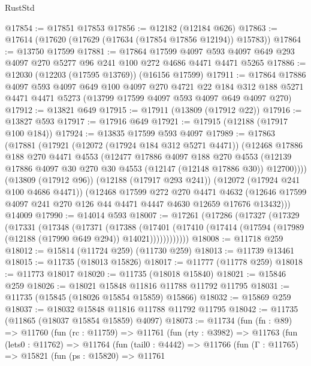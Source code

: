 \begin{lexlean}{RustStd}
\begin{coremodule}
@17854 := @17851 @17853
@17856 := @12182 (@12184 @626)
@17863 := @17614 (@17620 (@17629 (@17634 (@17854 @17856 @12194)) @15783))
@17864 := @13750 @17599
@17881 := @17864
    @17599
    @4097
    @593
    @4097
    @649
    @293
    @4097
    @270
    @5277
    @96
    @241
    @100
    @272
    @4686
    @4471
    @4471
    @5265
@17886 := @12030 (@12203 (@17595 @13769)) (@16156 @17599)
@17911 := @17864
    @17886
    @4097
    @593
    @4097
    @649
    @100
    @4097
    @270
    @4721
    @22
    @184
    @312
    @188
    @5271
    @4471
    @4471
    @5273
    (@13799 @17599 @4097 @593 @4097 @649 @4097 @270)
@17912 := @13821 @649
@17915 := @17911 (@13809 (@17912 @22))
@17916 := @13827 @593
@17917 := @17916 @649
@17921 := @17915 (@12188 (@17917 @100 @184))
@17924 := @13835 @17599 @593 @4097
@17989 := @17863
    (@17881
      (@17921
        (@12072 (@17924 @184 @312 @5271 @4471))
        (@12468
          @17886
          @188
          @270
          @4471
          @4553
          (@12477
            @17886
            @4097
            @188
            @270
            @4553
            (@12139 @17886 @4097 @30 @270 @30 @4553 (@12147 (@12148 @17886 @30)) @12700))))
      (@13809 (@17912 @96))
      (@12188 (@17917 @293 @241))
      (@12072 (@17924 @241 @100 @4686 @4471))
      (@12468
        @17599
        @272
        @270
        @4471
        @4632
        (@12646 @17599 @4097 @241 @270 @126 @44 @4471 @4447 @4630 @12659 @17676 @13432)))
    @14009
@17990 := @14014 @593
@18007 := @17261
    (@17286
      (@17327
        (@17329
          (@17331
            (@17348
              (@17371
                (@17388
                  (@17401
                    (@17410 (@17414 (@17594 (@17989 (@12188 (@17990 @649 @294)) @14021))))))))))))
@18008 := @11718 @259
@18012 := @15814 (@11724 @259) (@11730 @259)
@18013 := @11739 @13461
@18015 := @11735 (@18013 @15826)
@18017 := @11777 (@11778 @259)
@18018 := @11773 @18017
@18020 := @11735 (@18018 @15840)
@18021 := @15846 @259
@18026 := @18021 @15848 @11816 @11788 @11792 @11795
@18031 := @11735 (@15845 (@18026 @15854 @15859) @15866)
@18032 := @15869 @259
@18037 := @18032 @15848 @11816 @11788 @11792 @11795
@18042 := @11735 (@11865 (@18037 @15854 @15859) @4097)
@18073 := @11734
    (fun (fn : @89) =>
    @11760
      (fun (rc : @11759) =>
      @11761
        (fun (rty : @3982) =>
        @11763
          (fun (lets0 : @11762) =>
          @11764
            (fun (tail0 : @4442) =>
            @11766
              (fun (Γ : @11765) =>
              @15821
                (fun (ps : @15820) =>
                @11761

\end{coremodule}
\end{lexlean}
